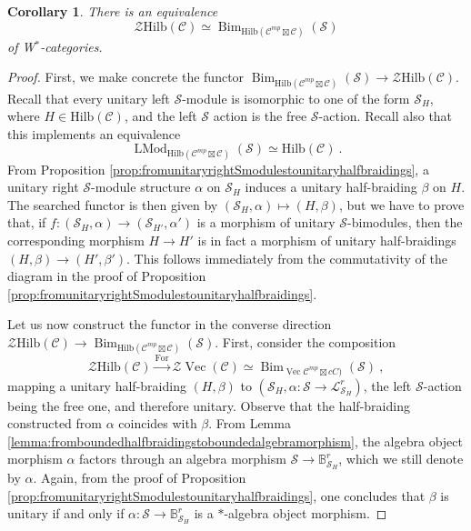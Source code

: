 \documentclass[a4paper,11pt,reqno]{amsart}
\numberwithin{equation}{section}
\newtheorem{corollary}[theorem]{Corollary}
\theoremstyle{remark}
\theoremstyle{definition}
\newcommand{\bB}{\mathbb B}
\newcommand{\cC}{\mathcal C}
\newcommand{\cL}{\mathcal L}
\newcommand{\cS}{\mathcal S}
\newcommand{\cZ}{\mathcal Z}
\DeclareMathOperator{\Vect}{Vec}
\DeclareMathOperator{\Bim}{Bim}
\DeclareMathOperator{\For}{For}
\DeclareMathOperator{\LMod}{LMod}
\newcommand{\Hilb}{\mathrm{Hilb}}
\begin{document}
\begin{corollary}
	There is an equivalence 
	\[ \cZ\Hilb(\cC) \simeq \Bim_{\Hilb(\cC^{mp} \boxtimes \cC)}(\cS) \]
	of W$^*$-categories.
	\label{cor:equivalencehalfbraidingsunitarybimodulesoverSEalgebra}
\end{corollary}
\begin{proof}
	First, we make concrete the functor $\Bim_{\Hilb(\cC^{mp} \boxtimes \cC)}(\cS) \to \cZ \Hilb(\cC)$. Recall that every unitary left $\cS$-module is isomorphic to one of the form $\cS_H$, where $H \in \Hilb(\cC)$, and the left $\cS$ action is the free $\cS$-action. Recall also that this implements an equivalence
	\[ \LMod_{\Hilb(\cC^{mp} \boxtimes \cC)}(\cS) \simeq \Hilb(\cC) \ . \]
	From Proposition \ref{prop:fromunitaryrightSmodulestounitaryhalfbraidings}, a unitary right $\cS$-module structure $\alpha$ on $\cS_H$ induces a unitary half-braiding $\beta$ on $H$. The searched functor is then given by $(\cS_H, \alpha) \mapsto (H,\beta)$, but we have to prove that, if $f: (\cS_H, \alpha) \to (\cS_{H'}, \alpha')$ is a morphism of unitary $\cS$-bimodules, then the corresponding morphism $H \to H'$ is in fact a morphism of unitary half-braidings $(H,\beta) \to (H', \beta')$. This follows immediately from the commutativity of the diagram in the proof of Proposition \ref{prop:fromunitaryrightSmodulestounitaryhalfbraidings}.
	
	Let us now construct the functor in the converse direction $\cZ \Hilb(\cC) \to \Bim_{\Hilb(\cC^{mp} \boxtimes \cC)}(\cS)$. First, consider the composition
	\[
	\cZ \Hilb(\cC) \overset{\For}{\to} \cZ \Vect(\cC) \simeq \Bim_{\Vect\cC^{mp} \boxtimes 
	cC)}(\cS) \ ,
	\]
	mapping a unitary half-braiding $(H, \beta)$ to $(\cS_H,\alpha: \cS \to \cL^r_{\cS_H})$, the left $\cS$-action being the free one, and therefore unitary. Observe that the half-braiding constructed from $\alpha$ coincides with $\beta$. From Lemma \ref{lemma:fromboundedhalfbraidingstoboundedalgebramorphism}, the algebra object morphism $\alpha$ factors through an algebra morphism $\cS \to \bB^r_{\cS_H}$, which we still denote by $\alpha$. Again, from the proof of Proposition \ref{prop:fromunitaryrightSmodulestounitaryhalfbraidings}, one concludes that $\beta$ is unitary if and only if $\alpha: \cS \to \bB^r_{\cS_H}$ is a $*$-algebra object morphism.
\end{proof}
\end{document}
